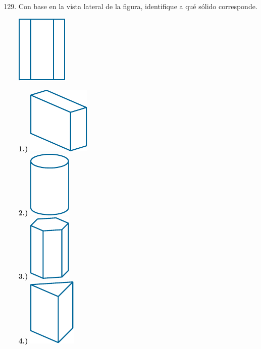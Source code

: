 \documentclass[11pt, a4paper]{article} %
\theoremstyle{dotlessP}
\theoremstyle{dotlessS}
\begin{document}
\begin{enumerate}[label=\color{dg}\theenumi.]
 \setcounter{enumi}{128}
  \normalsize
   \item {\color{db} Con base en la vista lateral de la figura, identifique a qué sólido corresponde.  } \\
	     \begin{center}
    \includegraphics[scale=0.3]{Figuras/129_1.pdf}
    \end{center}
        {\color{dh} \textbf{1.)} }   
	\includegraphics[scale=0.2]  {Figuras/129_2-1.pdf}\\
     {\color{dh} \textbf{2.)} }   
	\includegraphics[scale=0.2]{Figuras/129_2-2.pdf}\\
     {\color{dh} \textbf{3.)} }   
    	\includegraphics[scale=0.3]{Figuras/129_2-3.pdf}\\
         {\color{dh} \textbf{4.)} }   
        	\includegraphics[scale=0.3]{Figuras/129_2-4.pdf} \\

\end{enumerate}
\end{document}
